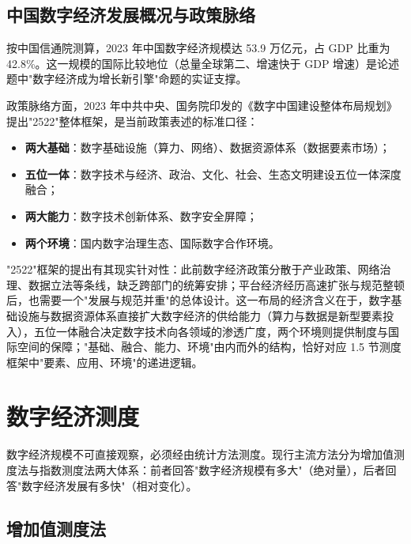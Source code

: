 \subsection{中国数字经济发展概况与政策脉络}

按中国信通院测算，2023 年中国数字经济规模达 53.9 万亿元，占 GDP 比重为 42.8\%。这一规模的国际比较地位（总量全球第二、增速快于 GDP 增速）是论述题中"数字经济成为增长新引擎"命题的实证支撑。

政策脉络方面，2023 年中共中央、国务院印发的《数字中国建设整体布局规划》提出"2522"整体框架，是当前政策表述的标准口径：

\begin{itemize}
\item \textbf{两大基础}：数字基础设施（算力、网络）、数据资源体系（数据要素市场）；
\item \textbf{五位一体}：数字技术与经济、政治、文化、社会、生态文明建设五位一体深度融合；
\item \textbf{两大能力}：数字技术创新体系、数字安全屏障；
\item \textbf{两个环境}：国内数字治理生态、国际数字合作环境。
\end{itemize}

"2522"框架的提出有其现实针对性：此前数字经济政策分散于产业政策、网络治理、数据立法等条线，缺乏跨部门的统筹安排；平台经济经历高速扩张与规范整顿后，也需要一个"发展与规范并重"的总体设计。这一布局的经济含义在于，数字基础设施与数据资源体系直接扩大数字经济的供给能力（算力与数据是新型要素投入），五位一体融合决定数字技术向各领域的渗透广度，两个环境则提供制度与国际空间的保障；"基础、融合、能力、环境"由内而外的结构，恰好对应 1.5 节测度框架中"要素、应用、环境"的递进逻辑。

\section{数字经济测度}

数字经济规模不可直接观察，必须经由统计方法测度。现行主流方法分为增加值测度法与指数测度法两大体系：前者回答"数字经济规模有多大"（绝对量），后者回答"数字经济发展有多快"（相对变化）。

\subsection{增加值测度法}

